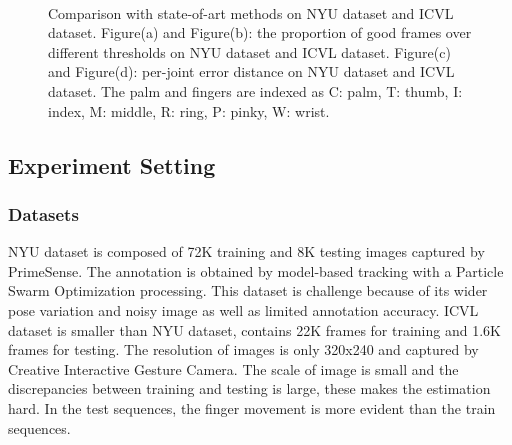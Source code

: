 \documentclass[journal,comsoc]{IEEEtran}
\let\MYoriglatexcaption\caption
\renewcommand{\caption}[2][\relax]{\MYoriglatexcaption[#2]{#2}}
\begin{document}
\begin{figure}[t]\footnotesize
\centering
    \\
    \caption{Comparison with state-of-art methods on NYU dataset and ICVL dataset. Figure(a) and Figure(b): the
    proportion of good frames over different thresholds on NYU dataset and ICVL dataset. Figure(c) and Figure(d):
    per-joint error distance on NYU dataset and ICVL dataset. The palm and fingers are indexed as C: palm, T:
    thumb, I: index, M: middle, R: ring, P: pinky, W: wrist.}
    \label{fig:Results}
\end{figure}
\subsection{Experiment Setting}\label{sec:experiment setting}
\subsubsection{Datasets}\label{sec:datasets}
NYU dataset is composed of 72K training and 8K testing images captured by PrimeSense. The
annotation is obtained by model-based tracking with a Particle Swarm Optimization processing.
This dataset is challenge because of its wider pose variation and noisy image as well as limited
annotation accuracy. ICVL dataset is smaller than NYU dataset, contains 22K frames for training
and 1.6K frames for testing. The resolution of images is only 320x240 and captured by Creative Interactive
Gesture Camera. The scale of image is small and the discrepancies between training and testing is
large, these makes the estimation hard. In the test sequences, the finger movement is more evident
than the train sequences.
\end{document}
